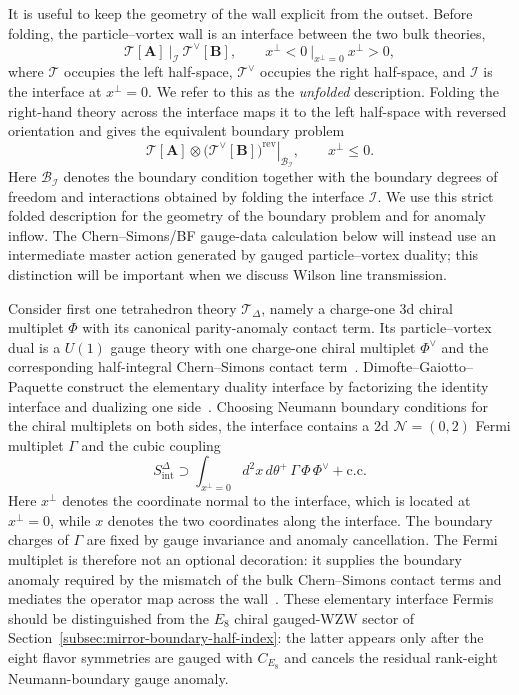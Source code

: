 \documentclass[11pt,a4paper]{article}
\numberwithin{equation}{section}
\begin{document}
It is useful to keep the geometry of the wall explicit from the outset.  Before folding, the particle--vortex wall is an interface between the two bulk theories,
\[
  \mathcal T[\boldsymbol A]
  \ \Big|_{\mathcal I}\ 
  \mathcal T^\vee[\boldsymbol B],
  \qquad
  x^\perp<0\ \Big|_{x^\perp=0}\ x^\perp>0,
\]
where $\mathcal T$ occupies the left half-space, $\mathcal T^\vee$ occupies the right half-space, and $\mathcal I$ is the interface at $x^\perp=0$.  We refer to this as the \emph{unfolded} description.  Folding the right-hand theory across the interface maps it to the left half-space with reversed orientation and gives the equivalent boundary problem
\[
  \left.
  \mathcal T[\boldsymbol A]\otimes
  \bigl(\mathcal T^\vee[\boldsymbol B]\bigr)^{\mathrm{rev}}
  \right|_{\mathcal B_{\mathcal I}},
  \qquad x^\perp\leq0.
\]
Here $\mathcal B_{\mathcal I}$ denotes the boundary condition together with the boundary degrees of freedom and interactions obtained by folding the interface $\mathcal I$.  We use this strict folded description for the geometry of the boundary problem and for anomaly inflow.  The Chern--Simons/BF gauge-data calculation below will instead use an intermediate master action generated by gauged particle--vortex duality; this distinction will be important when we discuss Wilson line transmission.

Consider first one tetrahedron theory $\mathcal T_\Delta$, namely a charge-one 3d chiral multiplet $\Phi$ with its canonical parity-anomaly contact term.  Its particle--vortex dual is a $U(1)$ gauge theory with one charge-one chiral multiplet $\Phi^\vee$ and the corresponding half-integral Chern--Simons contact term~\cite{Dimofte:2011py}.  Dimofte--Gaiotto--Paquette construct the elementary duality interface by factorizing the identity interface and dualizing one side~\cite{Dimofte:2017tpi}.  Choosing Neumann boundary conditions for the chiral multiplets on both sides, the interface contains a 2d $\mathcal N=(0,2)$ Fermi multiplet $\Gamma$ and the cubic coupling
\begin{equation}
  S_{\mathrm{int}}^{\Delta}
  \supset
  \int_{x^\perp=0} d^2x\,d\theta^+\,
  \Gamma\,\Phi\,\Phi^\vee
  +\text{c.c.}
  \label{eq:elementary-PV-wall-coupling}
\end{equation}
Here $x^\perp$ denotes the coordinate normal to the interface, which is located at $x^\perp=0$, while $x$ denotes the two coordinates along the interface.  The boundary charges of $\Gamma$ are fixed by gauge invariance and anomaly cancellation.  The Fermi multiplet is therefore not an optional decoration: it supplies the boundary anomaly required by the mismatch of the bulk Chern--Simons contact terms and mediates the operator map across the wall~\cite{Dimofte:2017tpi}.  These elementary interface Fermis should be distinguished from the $E_8$ chiral gauged-WZW sector of Section~\ref{subsec:mirror-boundary-half-index}: the latter appears only after the eight flavor symmetries are gauged with $C_{E_8}$ and cancels the residual rank-eight Neumann-boundary gauge anomaly.
\end{document}
